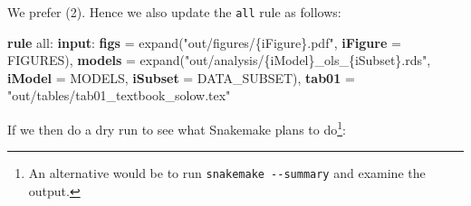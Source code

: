 \documentclass[]{book}
\newenvironment{Shaded}{\begin{snugshade}}{\end{snugshade}}
\newcommand{\KeywordTok}[1]{\textcolor[rgb]{0.13,0.29,0.53}{\textbf{{#1}}}}
\newcommand{\StringTok}[1]{\textcolor[rgb]{0.31,0.60,0.02}{{#1}}}
\newcommand{\NormalTok}[1]{{#1}}
\let\rmarkdownfootnote\footnote%
\def\footnote{\protect\rmarkdownfootnote}
\theoremstyle{definition}
\theoremstyle{definition}
\theoremstyle{definition}
\theoremstyle{remark}
\begin{document}
We prefer (2). Hence we also update the \texttt{all} rule as follows:

\begin{Shaded}
\begin{Highlighting}[]
\KeywordTok{rule} \NormalTok{all:}
    \KeywordTok{input}\NormalTok{:}
        \KeywordTok{figs}   \NormalTok{= expand(}\StringTok{"out/figures/\{iFigure\}.pdf"}\NormalTok{,}
                            \KeywordTok{iFigure} \NormalTok{= FIGURES),}
        \KeywordTok{models} \NormalTok{= expand(}\StringTok{"out/analysis/\{iModel\}_ols_\{iSubset\}.rds"}\NormalTok{,}
                            \KeywordTok{iModel} \NormalTok{= MODELS,}
                            \KeywordTok{iSubset} \NormalTok{= DATA_SUBSET),}
        \KeywordTok{tab01}  \NormalTok{= }\StringTok{"out/tables/tab01_textbook_solow.tex"}
\end{Highlighting}
\end{Shaded}

If we then do a dry run to see what Snakemake plans to do\footnote{An
  alternative would be to run \texttt{snakemake\ -\/-summary} and
  examine the output.}:
\end{document}
